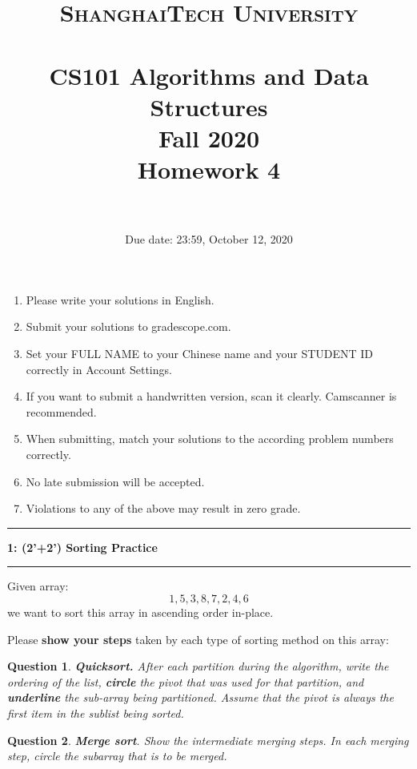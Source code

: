 \documentclass[10.5pt]{article}
\title{
	\normalfont \normalsize
	\textsc{ShanghaiTech University} \\ [25pt]
	\horrule{0.5pt} \\[0.4cm] %
	\huge CS101 Algorithms and Data Structures\\ %
	\LARGE Fall 2020\\
	\LARGE Homework 4\\
	\horrule{2pt} \\[0.5cm] %
}
\author{}
\date{Due date: 23:59, October 12, 2020}
\newcommand\question[2]{\vspace{.25in}\hrule\textbf{#1: #2}\vspace{.5em}\hrule\vspace{.10in}}
\newtheorem{Q}{Question}
\begin{document}
	
	\maketitle
	\thispagestyle{firstpage}
	\vspace{3ex}
	
	\begin{enumerate}
		\item Please write your solutions in English. 
		
		\item Submit your solutions to gradescope.com.  
		
		\item Set your FULL NAME to your Chinese name and your STUDENT ID correctly in Account Settings. 
		
		\item If you want to submit a handwritten version, scan it clearly. Camscanner is recommended. 
		
		\item When submitting, match your solutions to the according problem numbers correctly. 
		
		\item No late submission will be accepted.
		
		\item Violations to any of the above may result in zero grade. 
	\end{enumerate}
	\newpage

\question{1}{(2'+2') Sorting Practice}
Given array:
$$1,   5,   3,   8,   7,   2,   4,   6$$
we want to sort this array in ascending order in-place.

Please \textbf{show your steps} taken by each type of sorting method on this array:
\begin{Q} \textbf{Quicksort.}
After each partition during the algorithm, write the ordering of the list, \textbf{circle} the pivot that was used for that partition, and \textbf{underline} the sub-array being partitioned. Assume that the pivot is always the first item in the sublist being sorted.
\end{Q}

\vspace{4cm}

\begin{Q}\textbf{Merge sort}. Show the intermediate merging steps. In each merging step, circle the subarray that is to be merged.
\end{Q}

\pagebreak
	
\end{document}
